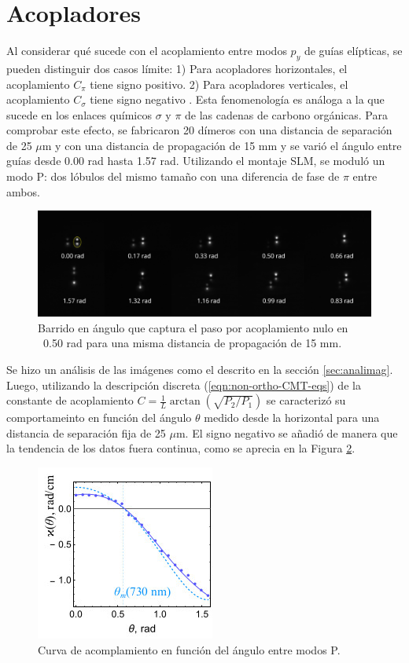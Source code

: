 \section{Acopladores}
Al considerar qué sucede con el acoplamiento entre modos $p_y$ de guías elípticas, se pueden distinguir dos casos límite: 1) Para acopladores horizontales, el acoplamiento $C_\pi$ tiene signo positivo. 2) Para acopladores verticales, el acoplamiento $C_\sigma$ tiene signo negativo \cite{Pmodecoupling}. Esta fenomenología es análoga a la que sucede en los enlaces químicos $\sigma$ y $\pi$ de las cadenas de carbono orgánicas. Para comprobar este efecto, se fabricaron 20 dímeros con una distancia de separación de 25 $\mu$m y con una distancia de propagación de 15 mm y se varió el ángulo entre guías desde 0.00 rad hasta 1.57 rad. Utilizando el montaje SLM, se moduló un modo P: dos lóbulos del mismo tamaño con una diferencia de fase de $\pi$ entre ambos.
\begin{figure}[H]
	\centering
	\includegraphics[trim={0 2cm 0 4cm},clip, width=\linewidth]{media/26um_15mm_angles.png}
	\caption{Barrido en ángulo que captura el paso por acoplamiento nulo en ~0.50 rad para una misma distancia de propagación de 15 mm. \label{fig:angulobarrido}}
\end{figure}
Se hizo un análisis de las imágenes como el descrito en la sección \ref{sec:analimag}. Luego, utilizando la descripción discreta (\ref{eqn:non-ortho-CMT-eqs}) de la constante de acoplamiento $C = \frac{1}{L}\arctan\left(\sqrt{P_2/P_1}\right)$ se caracterizó su comportameinto en función del ángulo $\theta$ medido desde la horizontal para una distancia de separación fija de 25 $\mu$m. El signo negativo se añadió de manera que la tendencia de los datos fuera continua, como se aprecia en la Figura \ref{fig:coupangle}.
\begin{figure}[H]
\centering
	\includegraphics[width=0.5\linewidth]{media/couplingvsangle.jpg}
	\caption{Curva de acomplamiento en función del ángulo entre modos P.\label{fig:coupangle}}
\end{figure}
